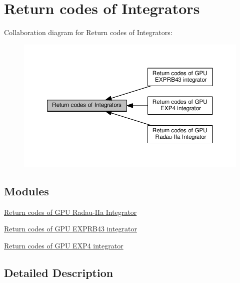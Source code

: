\hypertarget{group__CUErrorCodes}{}\section{Return codes of Integrators}
\label{group__CUErrorCodes}
Collaboration diagram for Return codes of Integrators\+:
\nopagebreak
\begin{figure}[H]
\begin{center}
\leavevmode
\includegraphics[width=350pt]{group__CUErrorCodes}
\end{center}
\end{figure}
\subsection*{Modules}
\begin{DoxyCompactItemize}
\item 
\hyperlink{group__RKCU__ErrCodes}{Return codes of G\+P\+U Radau-\/\+I\+Ia Integrator}
\item 
\hyperlink{group__exp4cu__ErrCodes}{Return codes of G\+P\+U E\+X\+P\+R\+B43 integrator}
\item 
\hyperlink{group__exprb43cu__ErrCodes}{Return codes of G\+P\+U E\+X\+P4 integrator}
\end{DoxyCompactItemize}


\subsection{Detailed Description}
